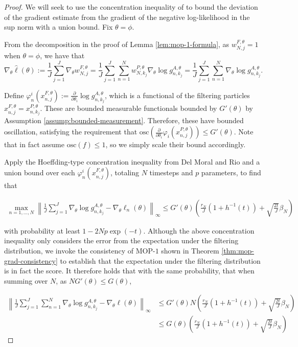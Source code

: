 \begin{proof}


We will seek to use the concentration inequality of \cite{delMoral11} to bound the deviation of the gradient estimate from the gradient of the negative log-likelihood in the sup norm with a union bound. Fix $\theta = \phi$.


From the decomposition in the proof of Lemma \ref{lem:mop-1-formula}, as $w_{N, j}^{F, \theta}=1$ when $\theta=\phi$, we have that
$$
\nabla_\theta \hat{\ell}(\theta):=\frac{1}{J} \sum_{j=1}^J \nabla_\theta w_{N, j}^{F, \theta}=\frac{1}{J} \sum_{j=1}^J\sum_{n=1}^N  w_{N, k_j}^{P, \theta} \nabla_\theta \log g_{n,k_j}^{A,\theta} = \frac{1}{J} \sum_{j=1}^J\sum_{n=1}^N \nabla_\theta \log g_{n,k_j}^{A,\theta}.
$$

Define $\varphi_n^i(x_{n,j}^{F,\theta}) := \frac{\partial}{\partial\theta_i} \log g_{n,k_j}^{A,\theta}$, which is a functional of the filtering particles $x_{n,j}^{F,\theta} = x_{n,k_j}^{P,\theta}$. These are bounded measurable functionals bounded by $G'(\theta)$ by Assumption \ref{assump:bounded-measurement}. Therefore, these have bounded oscillation, satisfying the requirement that $\text{osc} \left(\frac{\partial}{\partial\theta_i} \varphi_i(x_{n,j}^{P,\theta}) \right) \leq G'(\theta)$. Note that \cite{delMoral11} in fact assume $\text{osc}(f) \leq 1$, so we simply scale their bound accordingly.


Apply the Hoeffding-type concentration inequality from Del Moral and Rio \cite{delMoral11} and a union bound over each $\varphi_n^i(x_{n,j}^{F,\theta})$, totaling $N$ timesteps and $p$ parameters, to find that

\begin{align}
    \max_{n=1,...,N} \left\lVert\frac{1}{J}\sum_{j=1}^J\nabla_\theta \log g_{n,k_j}^{A,\theta} - \nabla_\theta \ell_n(\theta) \right\rVert_{\infty} \leq G'(\theta)\left(\frac{r_N}{J}(1+h^{-1}(t)) + \sqrt{\frac{2t}{J}}\beta_N \right)
\end{align}

with probability at least $1-2Np\exp(-t)$. Although the above concentration inequality only considers the error from the expectation under the filtering distribution, we invoke the consistency of MOP-$1$ shown in Theorem \ref{thm:mop-grad-consistency} to establish that the expectation under the filtering distribution is in fact the score. It therefore holds that with the same probability, that when summing over $N$, as $NG'(\theta) \leq G(\theta)$, 

\begin{align}
    \left\lVert\frac{1}{J}\sum_{j=1}^J\sum_{n=1}^N\nabla_\theta \log g_{n,k_j}^{A,\theta} - \nabla_\theta \ell(\theta) \right\rVert_{\infty} 
    &\leq G'(\theta)N\left(\frac{r_N}{J}(1+h^{-1}(t)) + \sqrt{\frac{2t}{J}}\beta_N \right)\\
    &\leq G(\theta)\left(\frac{r_N}{J}(1+h^{-1}(t)) + \sqrt{\frac{2t}{J}}\beta_N \right)
\end{align}



\end{proof}
